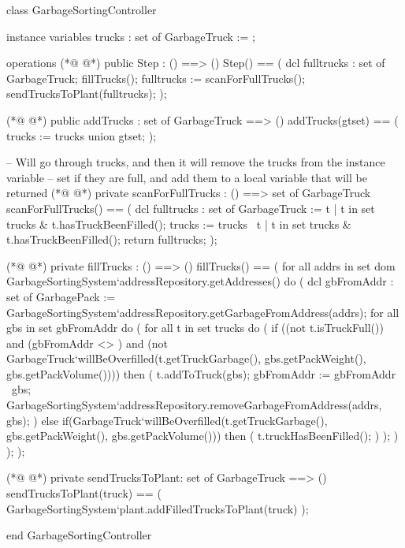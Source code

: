 \begin{vdmpp}[breaklines=true]
class GarbageSortingController

instance variables
trucks : set of GarbageTruck := {};

operations
(*@
\label{Step:7}
@*)
public Step : () ==> ()
Step() == 
(
    dcl fulltrucks : set of GarbageTruck;
    fillTrucks();
    fulltrucks := scanForFullTrucks();
    sendTrucksToPlant(fulltrucks);
);

(*@
\label{addTrucks:16}
@*)
public addTrucks : set of GarbageTruck ==> ()
addTrucks(gtset) == 
(
    trucks := trucks union gtset;
);

-- Will go through trucks, and then it will remove the trucks from the instance variable 
-- set if they are full, and add them to a local variable that will be returned
(*@
\label{scanForFullTrucks:24}
@*)
private scanForFullTrucks : () ==> set of GarbageTruck
scanForFullTrucks() ==
(
    dcl fulltrucks : set of GarbageTruck := {t | t in set trucks & t.hasTruckBeenFilled()};
    trucks := trucks \ {t | t in set trucks & t.hasTruckBeenFilled()};
    return fulltrucks;
);

(*@
\label{fillTrucks:32}
@*)
private fillTrucks : () ==> ()
fillTrucks() ==
(
    for all addrs in set dom GarbageSortingSystem`addressRepository.getAddresses()
    do
        (
        dcl gbFromAddr : set of GarbagePack := GarbageSortingSystem`addressRepository.getGarbageFromAddress(addrs);
            for all gbs in set gbFromAddr
            do
            (
                for all t in set trucks
                do
                    (
                        if ((not t.isTruckFull()) 
                            and (gbFromAddr <> {}) 
                            and (not GarbageTruck`willBeOverfilled(t.getTruckGarbage(), gbs.getPackWeight(), gbs.getPackVolume()))) then
                            (
                                t.addToTruck(gbs);
                                gbFromAddr := gbFromAddr \ {gbs};
                                GarbageSortingSystem`addressRepository.removeGarbageFromAddress(addrs, gbs);
                            )
                            else if(GarbageTruck`willBeOverfilled(t.getTruckGarbage(), gbs.getPackWeight(), gbs.getPackVolume())) then 
                            (
                                t.truckHasBeenFilled();
                            )
                    );
            )
        );
);


(*@
\label{sendTrucksToPlant:63}
@*)
private sendTrucksToPlant: set of GarbageTruck ==> ()
sendTrucksToPlant(truck) == 
(
    GarbageSortingSystem`plant.addFilledTrucksToPlant(truck)
);


end GarbageSortingController
\end{vdmpp}
